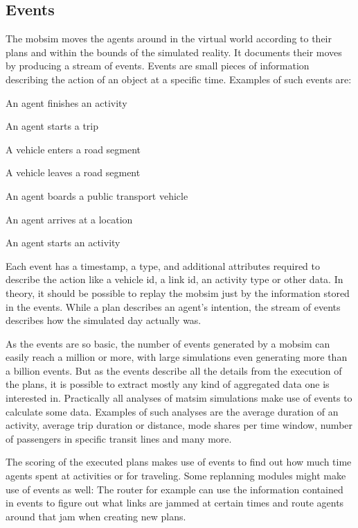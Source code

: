 \subsection{Events}
\label{sec:events-extension-point}
The \gls{mobsim} moves the agents around in the virtual world according to their plans and within the bounds of the simulated reality. It documents their moves by producing a stream of \glspl{event}. Events are small pieces of information describing the action of an object at a specific time. Examples of such events are:
\begin{compactitem}
\item An agent finishes an activity
\item An agent starts a trip
\item A vehicle enters a road segment
\item A vehicle leaves a road segment
\item An agent boards a public transport vehicle
\item An agent arrives at a location
\item An agent starts an activity
\end{compactitem}
%
Each event has a timestamp, a type, and additional attributes required to describe the action like a vehicle id, a link id, an activity type or other data. In theory, it should be possible to replay the \gls{mobsim} just by the information stored in the events. While a plan 
describes an agent's intention, the stream of events describes how the simulated day actually was.

As the events are so basic, the number of events generated by a \gls{mobsim} can easily reach a million or more, with large simulations even generating more than a billion events. But as the events describe all the details from the execution of the plans, it is possible to extract mostly any kind of aggregated data one is interested in. Practically all analyses of \gls{matsim} simulations make use of events to calculate some data. Examples of such analyses are the average duration of an activity, average trip duration or distance, mode shares per time window, number of passengers in specific transit lines and many more.

The scoring of the executed plans makes use of events to find out how much time agents spent at activities or for traveling. Some \gls{replanning} modules might make use of events as well: The router for example can use the information contained in events to figure out what links are jammed at certain times and route agents around that jam when creating new plans.

